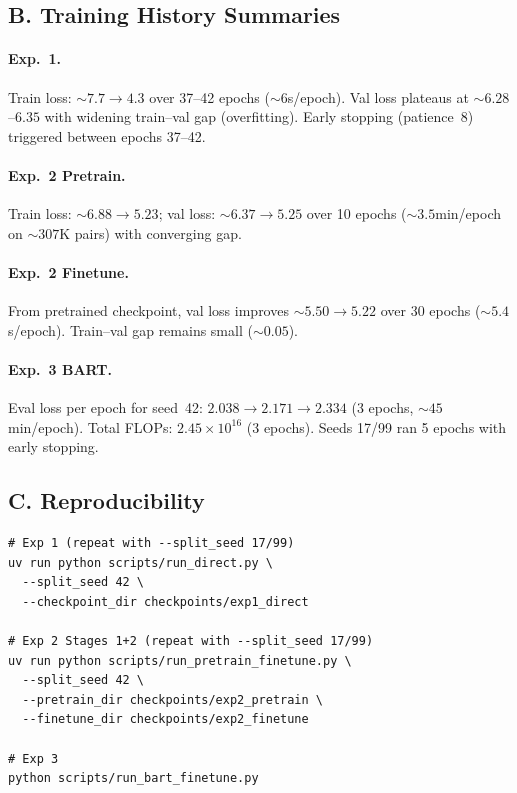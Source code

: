 \documentclass{article}
\begin{document}
\subsection*{B. Training History Summaries}

\paragraph{Exp.~1.} Train loss: ${\sim}7.7 \rightarrow 4.3$ over 37--42 epochs (${\sim}6$s/epoch). Val loss plateaus at ${\sim}6.28$--$6.35$ with widening train--val gap (overfitting). Early stopping (patience~8) triggered between epochs 37--42.

\paragraph{Exp.~2 Pretrain.} Train loss: ${\sim}6.88 \rightarrow 5.23$; val loss: ${\sim}6.37 \rightarrow 5.25$ over 10 epochs (${\sim}3.5$min/epoch on ${\sim}307$K pairs) with converging gap.

\paragraph{Exp.~2 Finetune.} From pretrained checkpoint, val loss improves ${\sim}5.50 \rightarrow 5.22$ over 30 epochs (${\sim}5.4$s/epoch). Train--val gap remains small (${\sim}0.05$).

\paragraph{Exp.~3 BART.} Eval loss per epoch for seed~42: $2.038 \rightarrow 2.171 \rightarrow 2.334$ (3 epochs, ${\sim}45$min/epoch). Total FLOPs: $2.45 \times 10^{16}$ (3 epochs). Seeds 17/99 ran 5 epochs with early stopping.


\subsection*{C. Reproducibility}

\begin{verbatim}
# Exp 1 (repeat with --split_seed 17/99)
uv run python scripts/run_direct.py \
  --split_seed 42 \
  --checkpoint_dir checkpoints/exp1_direct

# Exp 2 Stages 1+2 (repeat with --split_seed 17/99)
uv run python scripts/run_pretrain_finetune.py \
  --split_seed 42 \
  --pretrain_dir checkpoints/exp2_pretrain \
  --finetune_dir checkpoints/exp2_finetune

# Exp 3
python scripts/run_bart_finetune.py
\end{verbatim}
\end{document}
